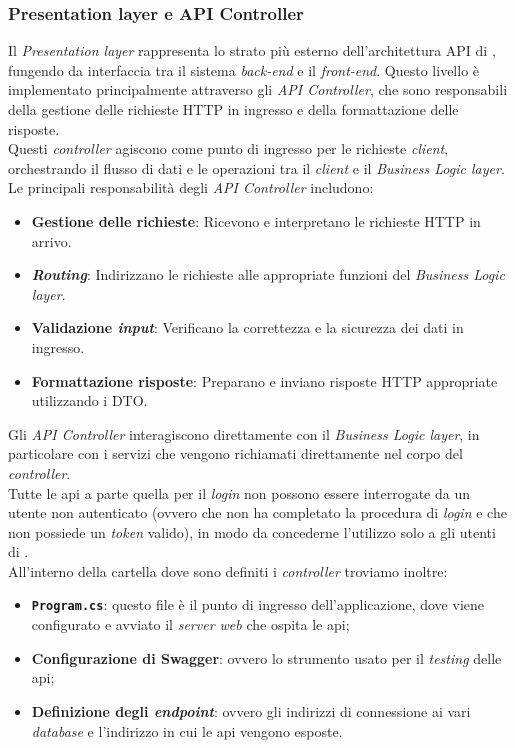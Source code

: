 \subsubsection{Presentation layer e API Controller}
Il \textit{Presentation layer} rappresenta lo strato più esterno dell'architettura API di {\movi}, fungendo da interfaccia 
tra il sistema \textit{back-end} e il \textit{front-end}. Questo livello è implementato principalmente attraverso gli 
\textit{API Controller}, che sono responsabili della gestione delle richieste HTTP in ingresso e della formattazione 
delle risposte.\\
Questi \textit{controller} agiscono come punto di ingresso per le richieste \textit{client}, orchestrando il flusso 
di dati e le operazioni tra il \textit{client} e il \textit{Business Logic layer}.\\
Le principali responsabilità degli \textit{API Controller} includono:
\begin{itemize}
    \item \textbf{Gestione delle richieste}: Ricevono e interpretano le richieste HTTP in arrivo.
    \item \textbf{\textit{Routing}}: Indirizzano le richieste alle appropriate funzioni del \textit{Business Logic layer}.
    \item \textbf{Validazione \textit{input}}: Verificano la correttezza e la sicurezza dei dati in ingresso.
    \item \textbf{Formattazione risposte}: Preparano e inviano risposte HTTP appropriate utilizzando i DTO.
\end{itemize}
Gli \textit{API Controller} interagiscono direttamente con il \textit{Business Logic layer}, in particolare con i 
servizi che vengono richiamati direttamente nel corpo del \textit{controller}.\\
Tutte le \gls{api} a parte quella per il \textit{login} non possono essere interrogate da un utente non autenticato 
(ovvero che non ha completato la procedura di \textit{login} e che non possiede un \textit{token} valido), in modo 
da concederne l'utilizzo solo a gli utenti di {\movi}.\\
All'interno della cartella dove sono definiti i \textit{controller} troviamo inoltre:
\begin{itemize}
    \item \textbf{\texttt{Program.cs}}: questo file è il punto di ingresso dell'applicazione, dove viene configurato e avviato il 
           \textit{server web} che ospita le \gls{api};
    \item \textbf{Configurazione di Swagger}: ovvero lo strumento usato per il \textit{testing} delle \gls{api};
    \item \textbf{Definizione degli \textit{endpoint}}: ovvero gli indirizzi di connessione ai vari \textit{database} 
          e l'indirizzo in cui le \gls{api} vengono esposte.
\end{itemize}
